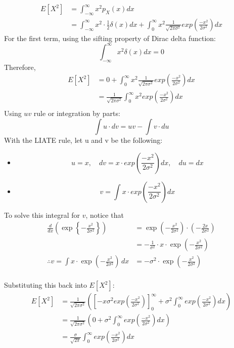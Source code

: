 \documentclass[12pt]{article}
\begin{document}
\begin{align*}
    E[X^2] &= \int_{-\infty}^{\infty} x^2 p_X(x) dx \\[10pt]
    &= \int_{-\infty}^{\infty} x^2 \cdot \frac{1}{2} \delta(x) dx + \int_{0}^{\infty} x^2 \frac{1}{\sqrt{2\pi\sigma^2}} exp\left(\frac{-x^2}{2\sigma^2}\right) dx
\end{align*}
For the first term, using the sifting property of Dirac delta function:\\
\[
    \int_{-\infty}^{\infty} x^2 \delta(x) dx = 0
\]
Therefore,
\begin{align*}
    E[X^2] &= 0 + \int_{0}^{\infty} x^2 \frac{1}{\sqrt{2\pi\sigma^2}} exp\left(\frac{-x^2}{2\sigma^2}\right) dx\\[10pt]
    &= \frac{1}{\sqrt{2\pi\sigma^2}} \int_{0}^{\infty} x^2 exp\left(\frac{-x^2}{2\sigma^2}\right) dx\\[10pt]
\end{align*}
Using $uv$ rule or integration by parts:
\[
\int u \cdot dv = uv - \int v \cdot du
\]
With the LIATE rule, let u and v be the following:
\begin{itemize}
    \item[]
    \[
    u=x, \quad dv=x \cdot exp\left(\frac{-x^2}{2\sigma^2}\right) dx, \quad du = dx
    \]
    \item[]
    \[
    v = \int x \cdot exp\left(\frac{-x^2}{2\sigma^2}\right) dx
    \]
\end{itemize}

\noindent To solve this integral for $v$, notice that 
\begin{align*}
    \frac{d}{dx} \left( \exp\left\{-\frac{x^2}{2\sigma^2}\right\} \right) &= \exp\left(-\frac{x^2}{2\sigma^2}\right) \cdot \left( -\frac{2x}{2\sigma^2} \right) \\[10pt]
    &= -\frac{1}{\sigma^2} \cdot x \cdot \exp\left(-\frac{x^2}{2\sigma^2}\right) \\[15pt]
    \therefore v = \int x \cdot \exp\left(-\frac{x^2}{2\sigma^2}\right) \, dx &= -\sigma^2 \cdot \exp\left(-\frac{x^2}{2\sigma^2}\right)\\[10pt]
\end{align*}

\noindent Substituting this back into $E[X^2]$:
\begin{align*}
    E[X^2] &= \frac{1}{\sqrt{2\pi\sigma^2}} \left( \left[-x \sigma^2 exp\left(\frac{-x^2}{2\sigma^2}\right)\right]_0^\infty + \sigma^2 \int_0^\infty exp\left(\frac{-x^2}{2\sigma^2}\right) dx \right) \\[10pt]
    &= \frac{1}{\sqrt{2\pi\sigma^2}} \left( 0 + \sigma^2 \int_0^\infty exp\left(\frac{-x^2}{2\sigma^2}\right) dx \right) \\[10pt]
    &= \frac{\sigma}{\sqrt{2\pi}} \int_0^\infty exp\left(\frac{-x^2}{2\sigma^2}\right) dx
\end{align*}
\end{document}

